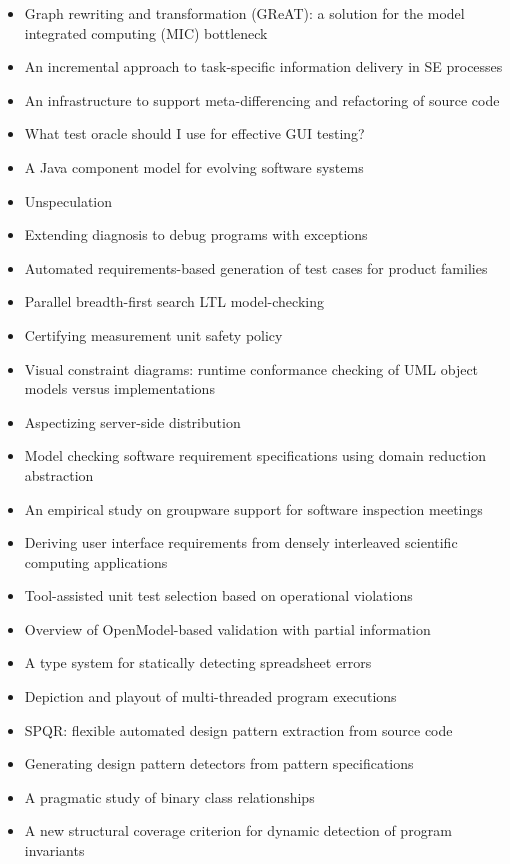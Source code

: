 {\begin{itemize}[itemsep=-1ex]
  \item Graph rewriting and transformation (GReAT): a solution for the model integrated computing (MIC) bottleneck
  \item An incremental approach to task-specific information delivery in SE processes
  \item An infrastructure to support meta-differencing and refactoring of source code
  \item What test oracle should I use for effective GUI testing?
  \item A Java component model for evolving software systems
  \item Unspeculation
  \item Extending diagnosis to debug programs with exceptions
  \item Automated requirements-based generation of test cases for product families
  \item Parallel breadth-first search LTL model-checking
  \item Certifying measurement unit safety policy
  \item Visual constraint diagrams: runtime conformance checking of UML object models versus implementations
  \item Aspectizing server-side distribution
  \item Model checking software requirement specifications using domain reduction abstraction
  \item An empirical study on groupware support for software inspection meetings
  \item Deriving user interface requirements from densely interleaved scientific computing applications
  \item Tool-assisted unit test selection based on operational violations
  \item Overview of OpenModel-based validation with partial information
  \item A type system for statically detecting spreadsheet errors
  \item Depiction and playout of multi-threaded program executions
  \item SPQR: flexible automated design pattern extraction from source code
  \item Generating design pattern detectors from pattern specifications
  \item A pragmatic study of binary class relationships
  \item A new structural coverage criterion for dynamic detection of program invariants

\end{itemize}}
